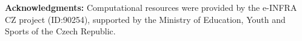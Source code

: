 

\renewcommand{\bibname}{Bibliography}



\vspace{1em}
\noindent \textbf{Acknowledgments:} Computational resources were provided by the e-INFRA CZ project (ID:90254), supported by the Ministry of Education, Youth and Sports of the Czech Republic.



